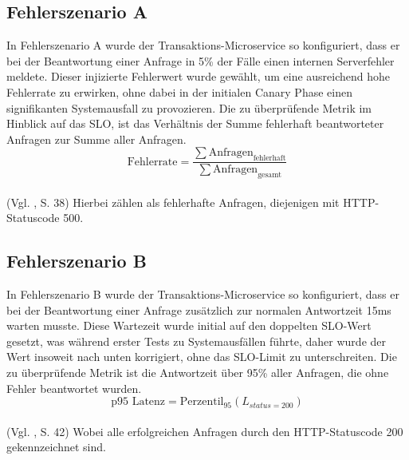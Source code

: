 \documentclass[
12pt,
a4paper,
twoside,
openright
]{report}
\begin{document}
	\subsection{Fehlerszenario A}
	In Fehlerszenario A wurde der Transaktions-Microservice so konfiguriert, dass er bei der Beantwortung einer Anfrage in 5\% der Fälle einen internen Serverfehler meldete. Dieser injizierte Fehlerwert wurde gewählt, um eine ausreichend hohe Fehlerrate zu erwirken, ohne dabei in der initialen Canary Phase einen signifikanten Systemausfall zu provozieren. Die zu überprüfende Metrik im Hinblick auf das SLO, ist das Verhältnis der Summe fehlerhaft beantworteter Anfragen zur Summe aller Anfragen.
	\\ \begin{equation}
		\text{Fehlerrate} = \frac{\sum \text{Anfragen}_\text{fehlerhaft}}{\sum \text{Anfragen}_{\text{gesamt}}}
	\end{equation} 
	\\ (Vgl. \parencite{GoogleSRE}, S. 38) Hierbei zählen als fehlerhafte Anfragen, diejenigen mit HTTP-Statuscode 500.
	
	\subsection{Fehlerszenario B}
	In Fehlerszenario B wurde der Transaktions-Microservice so konfiguriert, dass er bei der Beantwortung einer Anfrage zusätzlich zur normalen Antwortzeit 15ms warten musste. Diese Wartezeit wurde initial auf den doppelten SLO-Wert gesetzt, was während erster Tests zu Systemausfällen führte, daher wurde der Wert insoweit nach unten korrigiert, ohne das SLO-Limit zu unterschreiten. Die zu überprüfende Metrik ist die Antwortzeit über 95\% aller Anfragen, die ohne Fehler beantwortet wurden.
	\\
	\begin{equation}
	\text{p95 Latenz} = \text{Perzentil}_{95}(L_{status=200})
	\end{equation}
	\\ (Vgl. \parencite{GoogleSRE}, S. 42) Wobei alle erfolgreichen Anfragen durch den HTTP-Statuscode 200 gekennzeichnet sind.	
	
\end{document}
